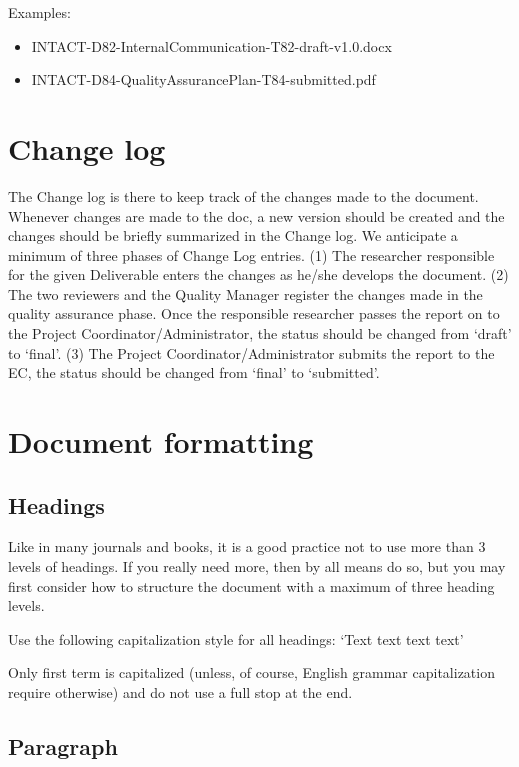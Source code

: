\documentclass[10pt]{report}
\begin{document}
Examples:

\begin{itemize}
    \item INTACT-D82-InternalCommunication-T82-draft-v1.0.docx
    \item INTACT-D84-QualityAssurancePlan-T84-submitted.pdf
\end{itemize}

\section{Change log}

The Change log is there to keep track of the changes made to the
document. Whenever changes are made to the doc, a new version should
be created and the changes should be briefly summarized in the Change
log. We anticipate a minimum of three phases of Change Log
entries. (1) The researcher responsible for the given Deliverable
enters the changes as he/she develops the document. (2) The two
reviewers and the Quality Manager register the changes made in the
quality assurance phase. Once the responsible researcher passes the
report on to the Project Coordinator/Administrator, the status should
be changed from ‘draft’ to ‘final’. (3) The Project
Coordinator/Administrator submits the report to the EC, the status
should be changed from ‘final’ to ‘submitted’.

\section{ Document formatting}
\label{sec:document-formatting}

\subsection{Headings}
\label{sec:headings}

Like in many journals and books, it is a good practice not to use more
than 3 levels of headings. If you really need more, then by all means
do so, but you may first consider how to structure the document with a
maximum of three heading levels.

Use the following capitalization style for all headings: ‘Text text
text text’

Only first term is capitalized (unless, of course, English grammar
capitalization require otherwise) and do not use a full stop at the
end.

\subsection{Paragraph}
\end{document}
